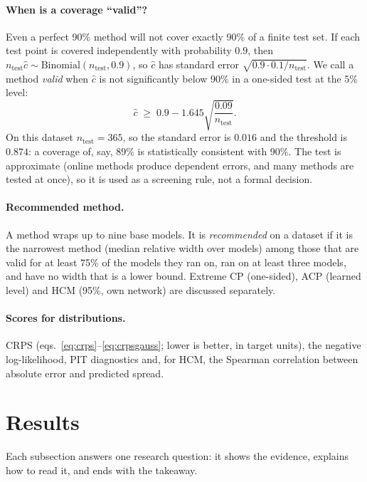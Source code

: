 \documentclass[11pt]{article}
\begin{document}
\paragraph{When is a coverage ``valid''?} Even a perfect 90\% method will not cover exactly 90\% of a finite test set. If each test
point is covered independently with probability $0.9$, then $n_{\text{test}}\hat c\sim\mathrm{Binomial}(n_{\text{test}},0.9)$, so
$\hat c$ has standard error $\sqrt{0.9\cdot0.1/n_{\text{test}}}$. We call a method \emph{valid} when $\hat c$ is not significantly
below 90\% in a one-sided test at the 5\% level:
\begin{equation}\label{eq:valid}
\hat c\;\ge\;0.9-1.645\sqrt{\frac{0.09}{n_{\text{test}}}} .
\end{equation}
On this dataset $n_{\text{test}}=365$, so the standard error is $0.016$ and the threshold is
$0.874$: a coverage of, say, 89\% is statistically consistent with 90\%.
The test is approximate (online methods produce dependent errors, and many methods are tested at once), so it is used as a
screening rule, not a formal decision.

\paragraph{Recommended method.} A method wraps up to nine base models. It is \emph{recommended} on a dataset if it is the
narrowest method (median relative width over models) among those that are valid for at least 75\% of the models they ran on,
ran on at least three models, and have no width that is a lower bound. Extreme CP (one-sided), ACP (learned level) and HCM (95\%,
own network) are discussed separately.

\paragraph{Scores for distributions.} CRPS (eqs.~\ref{eq:crps}--\ref{eq:crpsgauss}; lower is better, in target units), the negative
log-likelihood, PIT diagnostics and, for HCM, the Spearman correlation between absolute error and predicted spread.

\section{Results}\label{sec:results}
Each subsection answers one research question: it shows the evidence, explains how to read it, and ends with the takeaway.
\end{document}
